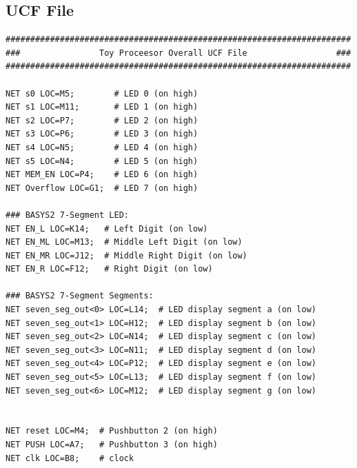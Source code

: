 \documentclass[12pt]{article}
\begin{document}
\subsection{UCF File}
	\begin{Verbatim}[frame=single, fontsize= \small]
######################################################################
###                Toy Proceesor Overall UCF File                  ###
######################################################################

NET s0 LOC=M5;        # LED 0 (on high)
NET s1 LOC=M11;       # LED 1 (on high)
NET s2 LOC=P7;        # LED 2 (on high)
NET s3 LOC=P6;        # LED 3 (on high)
NET s4 LOC=N5;        # LED 4 (on high)
NET s5 LOC=N4;        # LED 5 (on high)
NET MEM_EN LOC=P4;    # LED 6 (on high)
NET Overflow LOC=G1;  # LED 7 (on high)

### BASYS2 7-Segment LED:
NET EN_L LOC=K14;   # Left Digit (on low)
NET EN_ML LOC=M13;  # Middle Left Digit (on low)
NET EN_MR LOC=J12;  # Middle Right Digit (on low)
NET EN_R LOC=F12;   # Right Digit (on low)

### BASYS2 7-Segment Segments:
NET seven_seg_out<0> LOC=L14;  # LED display segment a (on low)
NET seven_seg_out<1> LOC=H12;  # LED display segment b (on low)
NET seven_seg_out<2> LOC=N14;  # LED display segment c (on low)
NET seven_seg_out<3> LOC=N11;  # LED display segment d (on low)
NET seven_seg_out<4> LOC=P12;  # LED display segment e (on low)
NET seven_seg_out<5> LOC=L13;  # LED display segment f (on low)
NET seven_seg_out<6> LOC=M12;  # LED display segment g (on low)


NET reset LOC=M4;  # Pushbutton 2 (on high)
NET PUSH LOC=A7;   # Pushbutton 3 (on high)
NET clk LOC=B8;    # clock


\end{Verbatim}
\end{document}
